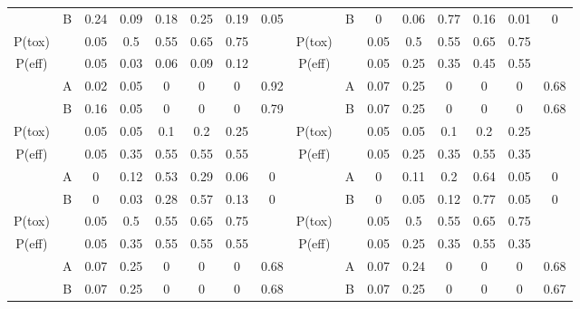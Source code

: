 \begin{table}
{\begin{tabular}[t]{ccccccc>{}c|cccccccc}
			\multirow{-2}{*}{\centering\arraybackslash 3} & B & 0.24 & 0.09 & 0.18 & 0.25 & 0.19 & 0.05 & \multirow{-2}{*}{\centering\arraybackslash 9} & B & 0 & 0.06 & 0.77 & 0.16 & 0.01 & 0\\
			\cmidrule{1-16}
			P(tox) &  & 0.05 & 0.5 & 0.55 & 0.65 & 0.75 &  & P(tox) &  & 0.05 & 0.5 & 0.55 & 0.65 & 0.75 \vphantom{1} & \\
			\cmidrule{1-16}
			P(eff) &  & 0.05 & 0.03 & 0.06 & 0.09 & 0.12 &  & P(eff) &  & 0.05 & 0.25 & 0.35 & 0.45 & 0.55 & \\
			\cmidrule{1-16}
			& A & 0.02 & 0.05 & 0 & 0 & 0 & 0.92 &  & A & 0.07 & 0.25 & 0 & 0 & 0 & 0.68\\
			
			\multirow{-2}{*}{\centering\arraybackslash 4} & B & 0.16 & 0.05 & 0 & 0 & 0 & 0.79 & \multirow{-2}{*}{\centering\arraybackslash 10} & B & 0.07 & 0.25 & 0 & 0 & 0 & 0.68\\
			\cmidrule{1-16}
			P(tox) &  & 0.05 & 0.05 & 0.1 & 0.2 & 0.25 &  & P(tox) &  & 0.05 & 0.05 & 0.1 & 0.2 & 0.25 & \\
			\cmidrule{1-16}
			P(eff) &  & 0.05 & 0.35 & 0.55 & 0.55 & 0.55 &  & P(eff) &  & 0.05 & 0.25 & 0.35 & 0.55 & 0.35 \vphantom{1} & \\
			\cmidrule{1-16}
			& A & 0 & 0.12 & 0.53 & 0.29 & 0.06 & 0 &  & A & 0 & 0.11 & 0.2 & 0.64 & 0.05 & 0\\
			
			\multirow{-2}{*}{\centering\arraybackslash 5} & B & 0 & 0.03 & 0.28 & 0.57 & 0.13 & 0 & \multirow{-2}{*}{\centering\arraybackslash 11} & B & 0 & 0.05 & 0.12 & 0.77 & 0.05 & 0\\
			\cmidrule{1-16}
			P(tox) &  & 0.05 & 0.5 & 0.55 & 0.65 & 0.75 &  & P(tox) &  & 0.05 & 0.5 & 0.55 & 0.65 & 0.75 & \\
			\cmidrule{1-16}
			P(eff) &  & 0.05 & 0.35 & 0.55 & 0.55 & 0.55 &  & P(eff) &  & 0.05 & 0.25 & 0.35 & 0.55 & 0.35 & \\
			\cmidrule{1-16}
			& A & 0.07 & 0.25 & 0 & 0 & 0 & 0.68 &  & A & 0.07 & 0.24 & 0 & 0 & 0 & 0.68\\
			
			\multirow{-2}{*}{\centering\arraybackslash 6} & B & 0.07 & 0.25 & 0 & 0 & 0 & 0.68 & \multirow{-2}{*}{\centering\arraybackslash 12} & B & 0.07 & 0.25 & 0 & 0 & 0 & 0.67\\
			\bottomrule
	\end{tabular}}
\end{table}

